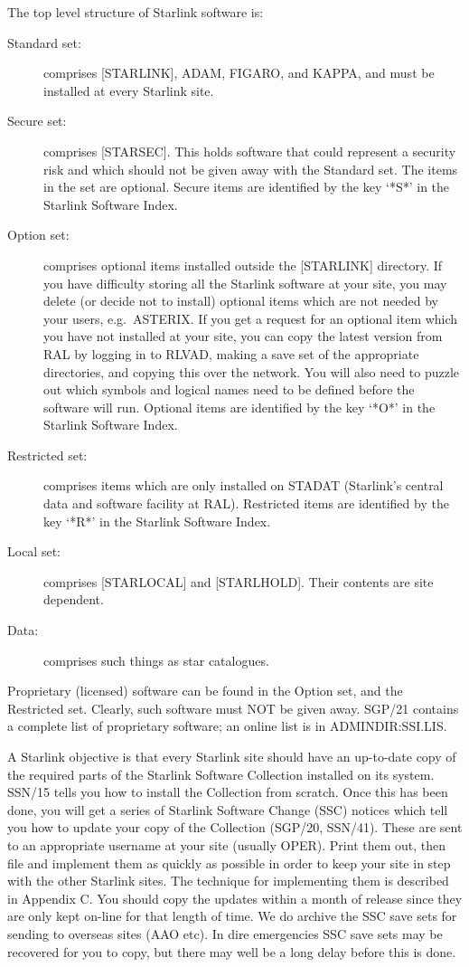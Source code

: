 The top level structure of Starlink software is:
\begin{description}
\begin{description}
\item [Standard set:] comprises [STARLINK], ADAM, FIGARO, and KAPPA, and must
be installed at every Starlink site.
\item [Secure set:] comprises [STARSEC].
This holds software that could represent a security risk and which should not
be given away with the Standard set.
The items in the set are optional.
Secure items are identified by the key `*S*' in the Starlink Software Index.
\item [Option set:] comprises optional items installed outside the [STARLINK]
directory.
If you have difficulty storing all the Starlink software at your site, you may
delete (or decide not to install) optional items which are not needed by your
users, e.g.\ ASTERIX.
If you get a request for an optional item which you have not installed at your
site, you can copy the latest version from RAL by logging in to RLVAD, making a
save set of the appropriate directories, and copying this over the network.
You will also need to puzzle out which symbols and logical names need to be
defined before the software will run.
Optional items are identified by the key `*O*' in the Starlink Software Index.
\item [Restricted set:] comprises items which are only installed on STADAT
(Starlink's central data and software facility at RAL).
Restricted items are identified by the key `*R*' in the Starlink Software Index.
\item [Local set:] comprises [STARLOCAL] and [STARLHOLD].
Their contents are site dependent.
\item [Data:] comprises such things as star catalogues.
\end{description}
\end{description}
Proprietary (licensed) software can be found in the Option set, and the
Restricted set.
Clearly, such software must NOT be given away.
SGP/21 contains a complete list of proprietary software; an online list is in
ADMINDIR:SSI.LIS.

A Starlink objective is that every Starlink site should have an
up-to-date copy of the required parts of the Starlink Software Collection
installed on its system.
SSN/15 tells you how to install the Collection from scratch.
Once this has been done, you will get a series of Starlink Software Change
(SSC) notices which tell you how to update your copy of the Collection (SGP/20,
SSN/41).
These are sent to an appropriate username at your site (usually OPER).
Print them out, then file and implement them as quickly as possible in order to
keep your site in step with the other Starlink sites. 
The technique for implementing them is described in Appendix C.
You should copy the updates within a month of release since they are only kept
on-line for that length of time.
We do archive the SSC save sets for sending to overseas sites (AAO etc).
In dire emergencies SSC save sets may be recovered for you to copy, but there
may well be a long delay before this is done.

